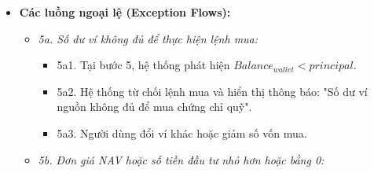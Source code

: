 \documentclass[11pt,a4paper]{article}
\providecommand{\tightlist}{
  \setlength{\itemsep}{0pt}\setlength{\parskip}{0pt}}
\begin{document}
\begin{itemize}
\begin{itemize}
\begin{itemize}
      \begin{itemize}
      \tightlist
      \item
        Số tiền bán thu về: \(Proceeds = sellUnits \times sellNav\).
      \item
        Giá vốn tương ứng của lượng CCQ bán:
        \(CostBasis = \frac{sellUnits}{Units} \times Principal\).
      \item
        Lợi nhuận thực tế đã hiện thực hóa:
        \(RealizedPL = Proceeds - CostBasis\).
      \end{itemize}
    \item
      2c6. Hệ thống thực hiện các bút toán đồng bộ:

      \begin{itemize}
      \tightlist
      \item
        Cộng số tiền thu về \(Proceeds\) vào số dư khả dụng của ví nhận
        tiền theo \texttt{BR-FIN-02}.
      \item
        Giảm số lượng CCQ nắm giữ của khoản đầu tư:
        \(Units_{mới} = Units - sellUnits\).
      \item
        Giảm vốn gốc của khoản đầu tư:
        \(Principal_{mới} = Principal - CostBasis\).
      \item
        Tính lại giá trị thị trường còn lại:
        \(Balance_{mới} = Units_{mới} \times sellNav\).
      \item
        Nếu \(Units_{mới} = 0\), chuyển trạng thái khoản đầu tư sang
        \texttt{CLOSED} (đã đóng).
      \end{itemize}
    \item
      2c7. Hệ thống ghi nhận \(RealizedPL\) vào báo cáo kết quả hoạt
      động tài chính trong kỳ.
    \item
      2c8. Nếu khoản đầu tư có liên kết quỹ mục tiêu, hệ thống cập nhật
      lại giá trị quỹ theo \texttt{BR-FIN-08}.
    \item
      2c9. Hệ thống thông báo hoàn tất giao dịch bán, hiển thị biên lai
      tóm tắt gồm số tiền thu về, lãi/lỗ thực tế và số lượng CCQ còn
      lại.
    \end{itemize}
  \end{itemize}
\item
  \textbf{Các luồng ngoại lệ (Exception Flows):}

  \begin{itemize}
  \tightlist
  \item
    \emph{5a. Số dư ví không đủ để thực hiện lệnh mua:}

    \begin{itemize}
    \tightlist
    \item
      5a1. Tại bước 5, hệ thống phát hiện
      \(Balance_{wallet} < principal\).
    \item
      5a2. Hệ thống từ chối lệnh mua và hiển thị thông báo: "Số dư ví
      nguồn không đủ để mua chứng chỉ quỹ".
    \item
      5a3. Người dùng đổi ví khác hoặc giảm số vốn mua.
    \end{itemize}
  \item
    \emph{5b. Đơn giá NAV hoặc số tiền đầu tư nhỏ hơn hoặc bằng 0:}


\end{itemize}
\end{itemize}
\end{document}
